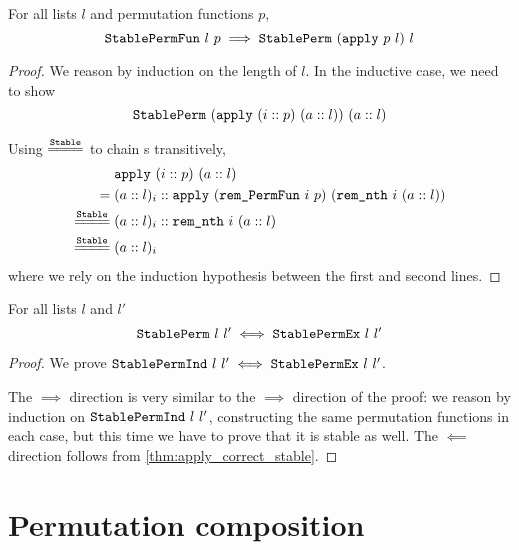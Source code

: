 \documentclass[sigplan,10pt,anonymous,review]{thesis}
\begin{document}
\begin{theorem}
  \label{thm:apply_correct_stable}
  For all lists $l$ and permutation functions $p$,
  \begin{equation*}
    \texttt{\textup{StablePermFun}}~l~p \implies \texttt{\textup{StablePerm}}~(\texttt{\textup{apply}}~p~l)~l
  \end{equation*}
\end{theorem}
\begin{proof}
  We reason by induction on the length of $l$. In the inductive case,
  we need to show
  \begin{equation*}
    \texttt{\textup{StablePerm}}~(\texttt{\textup{apply}}~(i :: p)~(a :: l))~(a :: l)
  \end{equation*}

  Using $\eqstable$ to chain s transitively,
  \begin{align*}
    {}& \var{apply}~(i :: p)~(a :: l) \\
    ={}& (a :: l)_i  ::
    \var{apply}~(\var{rem\_PermFun}~i~p)~(\var{rem\_nth}~i~(a :: l)) \\
    \eqstable{}& (a :: l)_i :: \var{rem\_nth}~i~(a :: l) \\
    \eqstable{}& (a :: l)_i
  \end{align*}
  where we rely on the induction hypothesis between the first and
  second lines.
\end{proof}

\begin{theorem}
  For all lists $l$ and $l'$
  \begin{equation*}
    \texttt{\textup{StablePerm}}~l~l' \iff \texttt{\textup{StablePermEx}}~l~l'
  \end{equation*}
\end{theorem}
\begin{proof}
  We prove $\texttt{\textup{StablePermInd}}~l~l' \iff \texttt{\textup{StablePermEx}}~l~l'$.

  The $\implies$ direction is very similar to the $\implies$ direction
  of the  proof: we reason by induction on
  $\texttt{\textup{StablePermInd}}~l~l'$, constructing the same permutation
  functions in each case, but this time we have to prove that it is
  stable as well. The $\impliedby$ direction follows from
  \cref{thm:apply_correct_stable}.
\end{proof}


\section{Permutation composition}
\label{appendix:perm_comp}
\end{document}
